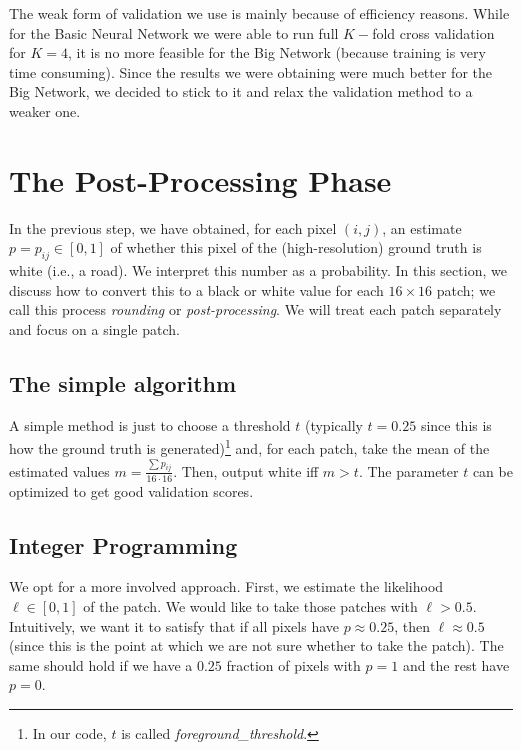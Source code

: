 \documentclass[10pt,conference,compsocconf]{IEEEtran}
\begin{document}
The weak form of validation we use is mainly because of efficiency reasons. While for the Basic Neural Network we were able to run full $K-$fold cross validation for $K=4$, it is no more feasible for the Big Network (because training is very time consuming). Since the results we were obtaining were much better for the Big Network, we decided to stick to it and relax the validation method to a weaker one.



\section{The Post-Processing Phase}\label{post}



In the previous step, we have obtained, for each pixel $(i,j)$, an estimate $p = p_{ij} \in [0,1]$ of whether this pixel of the (high-resolution) ground truth is white (i.e., a road). We interpret this number as a probability. In this section, we discuss how to convert this to a black or white value for each $16 \times 16$ patch; we call this process \emph{rounding} or \emph{post-processing}. We will treat each patch separately and focus on a single patch.

\subsection{The simple algorithm}

A simple method is just to choose a threshold $t$ (typically $t = 0.25$ since this is how the ground truth is generated)\footnote{In our code, $t$ is called \textit{foreground\_threshold}.} and, for each patch, take the mean of the estimated values $m = \frac{\sum p_{ij}}{16 \cdot 16}$. Then, output white iff $m > t$. The parameter $t$ can be optimized to get good validation scores.



\subsection{Integer Programming}

We opt for a more involved approach. First, we estimate the likelihood $\ell \in [0,1]$ of the patch. We would like to take those patches with $\ell > 0.5$. Intuitively, we want it to satisfy that if all pixels have $p \approx 0.25$, then $\ell \approx 0.5$ (since this is the point at which we are not sure whether to take the patch). The same should hold if we have a $0.25$ fraction of pixels with $p = 1$ and the rest have $p = 0$.
\end{document}
